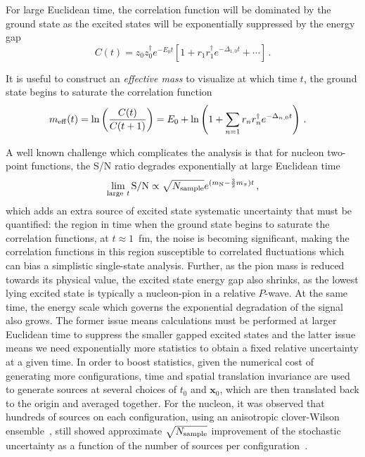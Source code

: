 For large Euclidean time, the correlation function will be dominated by the ground state as the excited states will be exponentially suppressed by the energy gap
\begin{equation}
    C(t) = z_0 z_0^\dagger e^{-E_0 t}\left[
        1 + r_1 r^\dagger_1 e^{-\Delta_{1,0}t} + \cdots \right]\, .
\end{equation}%
\begin{marginnote}
\end{marginnote}%
It is useful to construct an \textit{effective mass} to visualize at which time $t$, the ground state begins to saturate the correlation function
\begin{align}
m_{\rm eff}(t) &= \ln \left( \frac{C(t)}{C(t+1)} \right)
    =
    E_0 + \ln\left( 1 + \sum_{n=1} r_n r^\dagger_n e^{-\Delta_{n,0}t}\right)\, .
\end{align}


A well known challenge which complicates the analysis is that for nucleon two-point functions, the S/N ratio degrades exponentially at large Euclidean time~\cite{Lepage:1989hd}
\begin{equation}
\lim_{{\rm large}\ t} {\rm S/N}%
    \propto \sqrt{N_{\mathrm{sample}}} e^{(m_{\mathrm{N}} - \frac{3}{2}m_\pi)t}\, ,
\end{equation}
which adds an extra source of excited state systematic uncertainty that must be quantified:
the region in time when the ground state begins to saturate the correlation functions, at $t\approx 1$~fm, the noise is becoming significant, making the correlation functions in this region susceptible to correlated fluctuations which can bias a simplistic single-state analysis.
Further, as the pion mass is reduced towards its physical value, the excited state energy gap also shrinks, as the lowest lying excited state is typically a nucleon-pion in a relative $P$-wave.  At the same time, the energy scale which governs the exponential degradation of the signal also grows.  The former issue means calculations must be performed at larger Euclidean time to suppress the smaller gapped excited states and the latter issue means we need exponentially more statistics to obtain a fixed relative uncertainty at a given time.
In order to boost statistics, given the numerical cost of generating more configurations, time and spatial translation invariance are used to generate sources at several choices of $t_0$ and $\mathbf{x}_0$, which are then translated back to the origin and averaged together.  For the nucleon, it was observed that hundreds of sources on each configuration, using an anisotropic clover-Wilson ensemble~\cite{HadronSpectrum:2008xlg}, still showed approximate $\sqrt{N_{\rm sample}}$ improvement of the stochastic uncertainty as a function of the number of sources per configuration~\cite{Beane:2009kya}.



